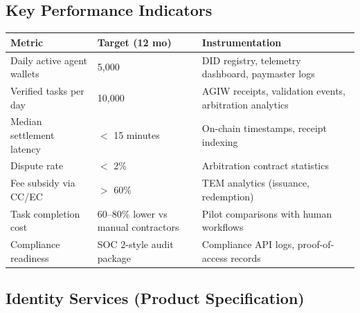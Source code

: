 \documentclass[11pt]{article}
\begin{document}
\subsection{Key Performance Indicators}
\begin{longtable}{@{}p{}p{}p{}@{}}
\toprule
\textbf{Metric} & \textbf{Target (12 mo)} & \textbf{Instrumentation} \\\midrule
Daily active agent wallets & 5,000 & DID registry, telemetry dashboard, paymaster logs \\
Verified tasks per day & 10,000 & AGIW receipts, validation events, arbitration analytics \\
Median settlement latency & $<$ 15 minutes & On-chain timestamps, receipt indexing \\
Dispute rate & $<$ 2\% & Arbitration contract statistics \\
Fee subsidy via CC/EC & $>$ 60\% & TEM analytics (issuance, redemption) \\
Task completion cost & 60--80\% lower vs manual contractors & Pilot comparisons with human workflows \\
Compliance readiness & SOC 2-style audit package & Compliance API logs, proof-of-access records \\
\bottomrule
\end{longtable}

\subsection{Identity Services (Product Specification)}
\label{sec:identity-spec}
\end{document}
